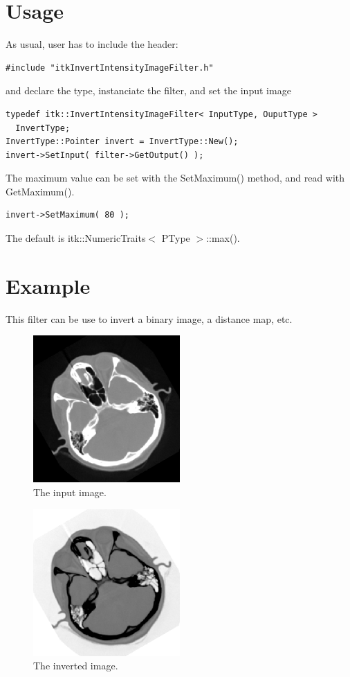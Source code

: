 \documentclass[IJ]{cesj}
\begin{document}
\section{Usage}
As usual, user has to include the header:
\begin{lstlisting}
#include "itkInvertIntensityImageFilter.h"
\end{lstlisting}
and declare the type, instanciate the filter, and set the input image
\begin{lstlisting}
typedef itk::InvertIntensityImageFilter< InputType, OuputType >
  InvertType;
InvertType::Pointer invert = InvertType::New();
invert->SetInput( filter->GetOutput() );
\end{lstlisting}
The maximum value can be set with the SetMaximum() method, and read with GetMaximum().
\begin{lstlisting}
invert->SetMaximum( 80 );
\end{lstlisting}
The default is itk::NumericTraits$<$ PType $>$::max().

\section{Example}
This filter can be use to invert a binary image, a distance map, etc.

\begin{figure}
\centering
\includegraphics[width=0.5\textwidth]{cthead1.eps}
\caption{The input image.}
\end{figure}

\begin{figure}
\centering
\includegraphics[width=0.5\textwidth]{invert.eps}
\caption{The inverted image.}
\end{figure}
\end{document}
